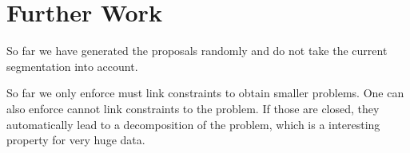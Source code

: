 \documentclass[10pt,twocolumn,letterpaper]{article}
\theoremstyle{definition}
\begin{document}
%






% 



%


\section{Further Work}\label{sec:future}
So far we have generated the proposals randomly and do not take the current segmentation into account.

So far we only enforce must link constraints to obtain smaller problems.
One can also enforce cannot link constraints to the problem. 
If those are closed, they automatically lead to a decomposition of the problem, 
which is a interesting property for very huge data.
\end{document}
